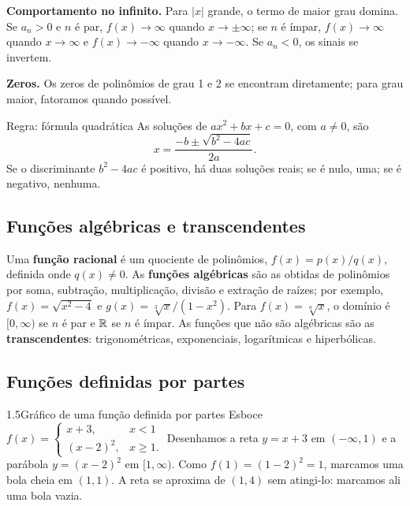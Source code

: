 \textbf{Comportamento no infinito.} Para $|x|$ grande, o termo de maior grau domina. Se
$a_n>0$ e $n$ é par, $f(x)\to\infty$ quando $x\to\pm\infty$; se $n$ é ímpar,
$f(x)\to\infty$ quando $x\to\infty$ e $f(x)\to-\infty$ quando $x\to-\infty$. Se $a_n<0$,
os sinais se invertem.

\textbf{Zeros.} Os zeros de polinômios de grau 1 e 2 se encontram diretamente; para grau
maior, fatoramos quando possível.

\begin{regra}{Regra: fórmula quadrática}
As soluções de $ax^2+bx+c=0$, com $a\neq0$, são
\[
x=\frac{-b\pm\sqrt{b^2-4ac}}{2a}.
\]
Se o discriminante $b^2-4ac$ é positivo, há duas soluções reais; se é nulo, uma; se é
negativo, nenhuma.
\end{regra}

\subsection{Funções algébricas e transcendentes}

Uma \textbf{função racional} é um quociente de polinômios, $f(x)=p(x)/q(x)$, definida onde
$q(x)\neq0$. As \textbf{funções algébricas} são as obtidas de polinômios por soma,
subtração, multiplicação, divisão e extração de raízes; por exemplo,
$f(x)=\sqrt{x^2-4}$ e $g(x)=\sqrt[3]{x}/(1-x^2)$. Para $f(x)=\sqrt[n]{x}$, o domínio é
$[0,\infty)$ se $n$ é par e $\mathbb{R}$ se $n$ é ímpar. As funções que não são algébricas são as
\textbf{transcendentes}: trigonométricas, exponenciais, logarítmicas e hiperbólicas.

\subsection{Funções definidas por partes}

\begin{exemplo}{1.5}{Gráfico de uma função definida por partes}
Esboce $f(x)=\begin{cases}x+3, & x<1\\ (x-2)^2, & x\ge1.\end{cases}$
\solucao
Desenhamos a reta $y=x+3$ em $(-\infty,1)$ e a parábola $y=(x-2)^2$ em $[1,\infty)$. Como
$f(1)=(1-2)^2=1$, marcamos uma bola cheia em $(1,1)$. A reta se aproxima de $(1,4)$ sem
atingi-lo: marcamos ali uma bola vazia.
\end{exemplo}

